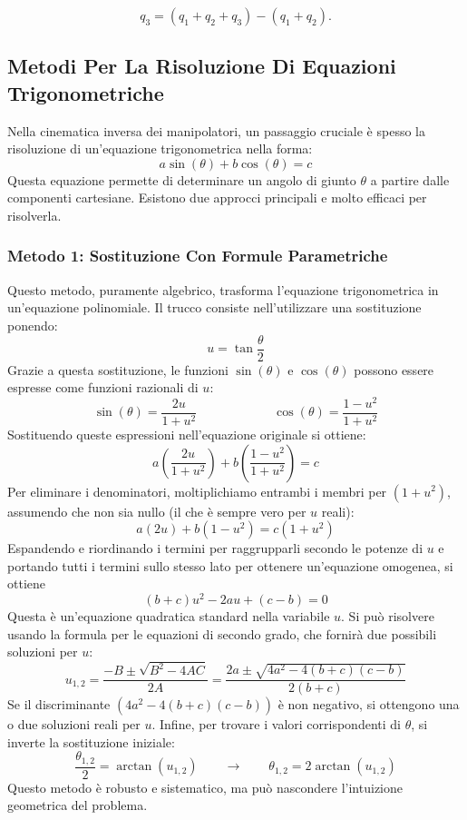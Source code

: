 \documentclass[11pt, a4paper]{report}
\begin{document}
\[
q_3 = (q_1 + q_2 + q_3) - (q_1 + q_2).
\]

\newpage
\subsection*{Metodi Per La Risoluzione Di Equazioni Trigonometriche}

Nella cinematica inversa dei manipolatori, un passaggio cruciale è spesso la risoluzione di un'equazione trigonometrica nella forma:
\[
    a \sin(\theta) + b \cos(\theta) = c
\]
Questa equazione permette di determinare un angolo di giunto \( \theta \) a partire dalle componenti cartesiane. Esistono due approcci principali e molto efficaci per risolverla.

\subsubsection*{Metodo 1: Sostituzione Con Formule Parametriche}

Questo metodo, puramente algebrico, trasforma l'equazione trigonometrica in un'equazione polinomiale. Il trucco consiste nell'utilizzare una sostituzione ponendo:
\[
    u = \tan \frac{\theta}{2}
\]
Grazie a questa sostituzione, le funzioni \( \sin(\theta) \) e \( \cos(\theta) \) possono essere espresse come funzioni razionali di \( u \):
\[
    \sin(\theta) = \frac{2u}{1 + u^2} \qquad \qquad \qquad \cos(\theta) = \frac{1 - u^2}{1 + u^2}
\]
Sostituendo queste espressioni nell'equazione originale si ottiene:
\[
    a \left( \frac{2u}{1 + u^2} \right) + b \left( \frac{1 - u^2}{1 + u^2} \right) = c
\]
Per eliminare i denominatori, moltiplichiamo entrambi i membri per \( (1 + u^2) \), assumendo che non sia nullo (il che è sempre vero per \( u \) reali):
\[
    a(2u) + b(1 - u^2) = c(1 + u^2)
\]
Espandendo e riordinando i termini per raggrupparli secondo le potenze di \( u \) e portando tutti i termini sullo stesso lato per ottenere un'equazione omogenea, si ottiene
\[
    (b + c)u^2 - 2au + (c - b) = 0
\]
Questa è un'equazione quadratica standard nella variabile \( u \). Si può risolvere usando la formula per le equazioni di secondo grado, che fornirà due possibili soluzioni per \( u \):
\[
    u_{1,2} = \frac{-B \pm \sqrt{B^2 - 4AC}}{2A} = \frac{2a \pm \sqrt{4a^{2} - 4(b+c)(c-b)}}{2(b+c)}
\]
Se il discriminante \( (4a^2 - 4(b+c)(c-b)) \) è non negativo, si ottengono una o due soluzioni reali per \( u \). Infine, per trovare i valori corrispondenti di \( \theta \), si inverte la sostituzione iniziale:
\[
    \frac{\theta_{1,2}}{2} = \arctan(u_{1,2}) \qquad \longrightarrow \qquad \theta_{1,2} = 2 \arctan(u_{1,2})
\]
Questo metodo è robusto e sistematico, ma può nascondere l'intuizione geometrica del problema.
\end{document}
